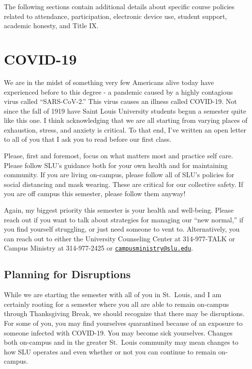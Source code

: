 \documentclass[
]{book}
\begin{document}
The following sections contain additional details about specific course policies related to attendance, participation, electronic device use, student support, academic honesty, and Title IX.

\hypertarget{covid-19}{%
\section{COVID-19}\label{covid-19}}

We are in the midst of something very few Americans alive today have experienced before to this degree - a pandemic caused by a highly contagious virus called ``SARS-CoV-2.'' This virus causes an illness called COVID-19. Not since the fall of 1919 have Saint Louis University students begun a semester quite like this one. I think acknowledging that we are all starting from varying places of exhaustion, stress, and anxiety is critical. To that end, I've written an open letter to all of you that I ask you to read before our first class.

Please, first and foremost, focus on what matters most and practice self care. Please follow SLU's guidance both for your own health and for maintaining community. If you are living on-campus, please follow all of SLU's policies for social distancing and mask wearing. These are critical for our collective safety. If you are off campus this semester, please follow them anyway!

Again, my biggest priority this semester is your health and well-being. Please reach out if you want to talk about strategies for managing our ``new normal,'' if you find yourself struggling, or just need someone to vent to. Alternatively, you can reach out to either the University Counseling Center at 314-977-TALK or Campus Ministry at 314-977-2425 or \href{mailto:campusministry@slu.edu}{\nolinkurl{campusministry@slu.edu}}.

\hypertarget{planning-for-disruptions}{%
\subsection{Planning for Disruptions}\label{planning-for-disruptions}}

While we are starting the semester with all of you in St.~Louis, and I am certainly rooting for a semester where you all are able to remain on-campus through Thanksgiving Break, we should recognize that there may be disruptions. For some of you, you may find yourselves quarantined because of an exposure to someone infected with COVID-19. You may become sick yourselves. Changes both on-campus and in the greater St.~Louis community may mean changes to how SLU operates and even whether or not you can continue to remain on-campus.
\end{document}
